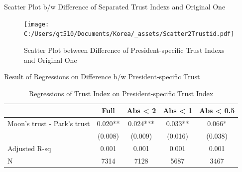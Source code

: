 \documentclass[
  ignorenonframetext,
]{beamer}
\begin{document}
\begin{frame}{Scatter Plot b/w Difference of Separated Trust Indexs and
Original One}
\protect\hypertarget{scatter-plot-bw-difference-of-separated-trust-indexs-and-original-one}{}

\begin{figure}
\centering
\texttt{[image: C:/Users/gt510/Documents/Korea/\_assets/Scatter2Trustid.pdf]}
\caption{Scatter Plot between Difference of President-specific Trust
Indexs and Original One}
\end{figure}

\end{frame}

\begin{frame}{Result of Regressions on Difference b/w President-specific
Trust}
\protect\hypertarget{result-of-regressions-on-difference-bw-president-specific-trust}{}

\begin{table}

\caption{\label{tab:kableRegTrustidOnDiff2Trustid}Regressions of Trust Index on President-specific Trust Index}
\centering
\fontsize{9}{11}\selectfont
\begin{tabular}[t]{lcccc}
\toprule
 & Full & Abs < 2 & Abs < 1 & Abs < 0.5\\
\midrule
Moon's trust - Park's trust & 0.020** & 0.024*** & 0.033** & 0.066*\\
 & (0.008) & (0.009) & (0.016) & (0.038)\\
Adjusted R-sq & 0.001 & 0.001 & 0.001 & 0.001\\
N & 7314 & 7128 & 5687 & 3467\\
\bottomrule
\end{tabular}
\end{table}

\end{frame}
\end{document}
